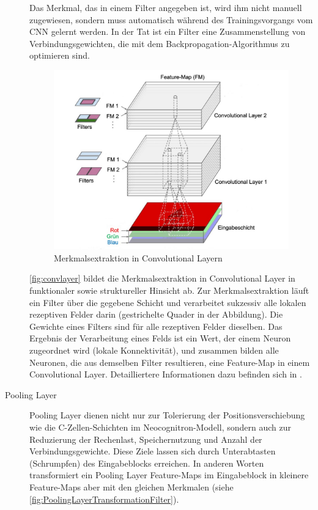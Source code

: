 \begin{description}
	Das Merkmal, das in einem Filter angegeben ist, wird ihm nicht manuell zugewiesen, sondern muss automatisch während des Trainingsvorgangs vom CNN gelernt werden. In der Tat ist ein Filter eine Zusammenstellung von Verbindungsgewichten, die mit dem Backpropagation-Algorithmus zu optimieren sind.
	\begin{figure}[!h]
	\centering
	\includegraphics[width=0.95\linewidth]{images/convolutionalLayer}
	\caption{Merkmalsextraktion in Convolutional Layern  \protect\cite{convlayer}}
	\label{fig:convlayer}
	\end{figure}

	\autoref{fig:convlayer} bildet die Merkmalsextraktion in Convolutional Layer in funktionaler sowie struktureller Hinsicht ab. Zur Merkmalsextraktion läuft ein Filter über die gegebene Schicht und verarbeitet sukzessiv alle lokalen rezeptiven Felder darin (gestrichelte Quader in der Abbildung). Die Gewichte eines Filters sind für alle rezeptiven Felder dieselben. Das Ergebnis der Verarbeitung eines Felds ist ein Wert, der einem Neuron zugeordnet wird (lokale Konnektivität), und zusammen bilden alle Neuronen, die aus demselben Filter resultieren, eine Feature-Map in einem Convolutional Layer. Detailliertere Informationen dazu befinden sich in \cite{10.5555/3378999}.

	\item[Pooling Layer] Pooling Layer dienen nicht nur zur Tolerierung der Positionsverschiebung wie die C-Zellen-Schichten im Neocognitron-Modell, sondern auch zur Reduzierung der Rechenlast, Speichernutzung und Anzahl der Verbindungsgewichte. Diese Ziele lassen sich durch Unterabtasten (Schrumpfen) des Eingabeblocks erreichen. In anderen Worten transformiert ein Pooling Layer Feature-Maps im Eingabeblock in kleinere Feature-Maps aber mit den gleichen Merkmalen (siehe \autoref{fig:PoolingLayerTransformationFilter}).
	

\end{description}
